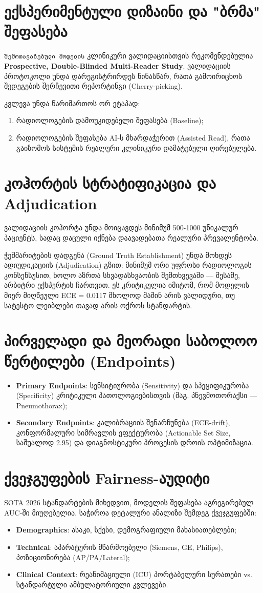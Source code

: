 \documentclass[12pt,a4paper,oneside]{report}
\begin{document}
\section{ექსპერიმენტული დიზაინი და "ბრმა" შეფასება}
\texttt{შემოთავაზებული მოდელის} კლინიკური ვალიდაციისთვის რეკომენდებულია \textbf{Prospective, Double-Blinded Multi-Reader Study}. ვალიდაციის პროტოკოლი უნდა დარეგისტრირდეს წინასწარ, რათა გამოირიცხოს შედეგების შერჩევითი რეპორტინგი (Cherry-picking). 

კვლევა უნდა წარიმართოს ორ ეტაპად:
\begin{enumerate}
    \item რადიოლოგების დამოუკიდებელი შეფასება (Baseline);
    \item რადიოლოგების შეფასება AI-ს მხარდაჭერით (Assisted Read), რათა გაიზომოს სისტემის რეალური კლინიკური დამატებული ღირებულება.
\end{enumerate}

\section{კოჰორტის სტრატიფიკაცია და Adjudication}
ვალიდაციის კოჰორტა უნდა მოიცავდეს მინიმუმ 500-1000 უნიკალურ პაციენტს, სადაც დაცული იქნება დაავადებათა რეალური პრევალენტობა. 

ჭეშმარიტების დადგენა (Ground Truth Establishment) უნდა მოხდეს ადიუდიკაციის (Adjudication) გზით: მინიმუმ ორი უფროსი რადიოლოგის კონსენსუსით, ხოლო აზრთა სხვადასხვაობის შემთხვევაში — მესამე, არბიტრი ექსპერტის ჩართვით. ეს კრიტიკულია იმიტომ, რომ მოდელის მიერ მიღწეული ECE = 0.0117 მხოლოდ მაშინ არის ვალიდური, თუ სატესტო ლეიბლები თავად არის ოქროს სტანდარტის.

\section{პირველადი და მეორადი საბოლოო წერტილები (Endpoints)}
\begin{itemize}
    \item \textbf{Primary Endpoints}: სენსიტიურობა (Sensitivity) და სპეციფიკურობა (Specificity) კრიტიკული პათოლოგიებისთვის (მაგ. პნევმოთორაქსი — Pneumothorax);
    \item \textbf{Secondary Endpoints}: კალიბრაციის შენარჩუნება (ECE-drift), კონფორმალური სიმრავლის ეფექტურობა (Actionable Set Size, საშუალოდ 2.95) და დიაგნოსტიკური პროცესის დროის ოპტიმიზაცია.
\end{itemize}

\section{ქვეჯგუფების Fairness-აუდიტი}
SOTA 2026 სტანდარტების მიხედვით, მოდელის შეფასება აგრეგირებულ AUC-ში მიუღებელია. საჭიროა დეტალური ანალიზი შემდეგ ქვეჯგუფებში:
\begin{itemize}
    \item \textbf{Demographics}: ასაკი, სქესი, დემოგრაფიული მახასიათებლები;
    \item \textbf{Technical}: აპარატურის მწარმოებელი (Siemens, GE, Philips), პოზიციონირება (AP/PA/Lateral);
    \item \textbf{Clinical Context}: რეანიმაციული (ICU) პორტაბელური სურათები vs. სტანდარტული ამბულატორიული კვლევები.
\end{itemize}
\end{document}
